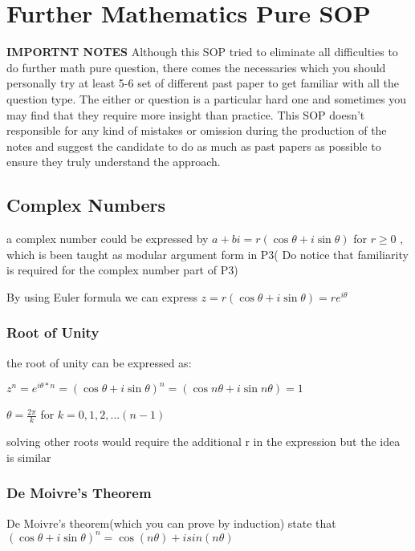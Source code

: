 \documentclass[]{article}
\date{}
\begin{document}
\section{Further Mathematics Pure SOP}\label{header-n0}

\textbf{IMPORTNT NOTES} Although this SOP tried to eliminate all
difficulties to do further math pure question, there comes the
necessaries which you should personally try at least 5-6 set of
different past paper to get familiar with all the question type. The
either or question is a particular hard one and sometimes you may find
that they require more insight than practice. This SOP doesn't
responsible for any kind of mistakes or omission during the production
of the notes and suggest the candidate to do as much as past papers as
possible to ensure they truly understand the approach.

\subsection{Complex Numbers}\label{header-n3}

a complex number could be expressed by
\(a +bi = r(\cos\theta + i\sin\theta)\) for \(r \geq 0\) , which is been
taught as modular argument form in P3( Do notice that familiarity is
required for the complex number part of P3)

By using Euler formula we can express
\(z = r(\cos\theta + i\sin \theta) = re^{i\theta}\)

\subsubsection{Root of Unity}\label{header-n6}

the root of unity can be expressed as:

\(z^n =e^{i\theta*n} =(\cos\theta + i\sin\theta)^n = (\cos n\theta + i\sin n\theta)= 1\)

\(\theta = \frac{2\pi}{k}\) for \( k=0,1,2,...(n-1)\)

solving other roots would require the additional r in the expression but
the idea is similar

\subsubsection{De Moivre's Theorem}\label{header-n11}

De Moivre's theorem(which you can prove by induction) state that
\((\cos\theta + i\sin\theta)^n = \cos(n\theta) + isin(n\theta)\)
\end{document}
